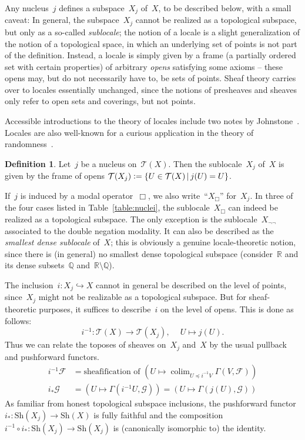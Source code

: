 \documentclass[10pt,reqno,a4paper]{amsbook}
\theoremstyle{definition}
\newtheorem{defn}{Definition}[section]
\theoremstyle{plain}
\theoremstyle{remark}
\newcommand{\F}{\mathcal{F}}
\renewcommand{\G}{\mathcal{G}}
\newcommand{\T}{\mathcal{T}}
\newcommand{\RR}{\mathbb{R}}
\newcommand{\QQ}{\mathbb{Q}}
\newcommand{\Sh}{\mathrm{Sh}}
\DeclareMathOperator{\colim}{colim}
\newcommand{\Open}{\T}
\newcommand{\?}{\,{:}\,}
\renewcommand{\_}{\mathpunct{.}\,}
\newcommand{\lra}{\longrightarrow}
\newcommand{\defeq}{\vcentcolon=}
\begin{document}
Any nucleus~$j$ defines a subspace~$X_j$ of~$X$, to be described below, with a small caveat: In
general, the subspace~$X_j$ cannot be realized as a topological subspace, but
only as a so-called \emph{sublocale}; the notion of a locale is a slight
generalization of the notion of a topological space, in which an underlying set
of points is not part of the definition. Instead, a locale is simply given by a
frame (a partially ordered set with certain properties) of arbitrary \emph{opens} satisfying some axioms -- these opens may, but do not necessarily have to,
be sets of points. Sheaf theory carries over to locales essentially unchanged,
since the notions of presheaves and sheaves only refer to open sets and coverings,
but not points.

Accessible introductions to the theory of locales include two notes by
Johnstone~\cite{johnstone:art,johnstone:point}. Locales are also well-known for
a curious application in the theory of
randomness~\cite{simpson:random1,simpson:random2}.

\begin{defn}\label{defn:subspace-by-nucleus}Let~$j$ be a nucleus on~$\Open(X)$.
Then the sublocale~$X_j$ of~$X$ is given by the frame of opens
$\Open(X_j) \defeq \{ U \in \Open(X) \,|\, j(U) = U \}$.
\end{defn}
If~$j$ is induced by a modal operator~$\Box$, we also write~``$X_\Box$''
for~$X_j$. In three of the four cases listed in Table~\ref{table:nuclei}, the
sublocale~$X_\Box$ can indeed be realized as a topological subspace. The only
exception is the sublocale~$X_{\neg\neg}$ associated to the double negation
modality. It can also be described as the \emph{smallest dense sublocale}
of~$X$; this is obviously a genuine locale-theoretic notion, since there
is (in general) no smallest dense topological subspace
(consider~$\RR$ and its dense subsets~$\QQ$ and~$\RR \setminus \QQ$).

The inclusion~$i : X_j \hookrightarrow X$ cannot in general be described on the
level of points, since~$X_j$ might not be realizable as a topological subspace.
But for sheaf-theoretic purposes, it suffices to describe~$i$ on the level of
opens. This is done as follows:
\[ i^{-1} : \Open(X) \lra \Open(X_j),\ \quad U \longmapsto j(U). \]
Thus we can relate the toposes of sheaves on~$X_j$ and~$X$ by the usual
pullback and pushforward functors.
\begin{align*}
  i^{-1} \F &= \text{sheafification of $(U \mapsto \colim_{U \preceq i^{-1}V} \Gamma(V,\F))$} \\
  i_* \G &= (U \mapsto \Gamma(i^{-1}U, \G)) = (U \mapsto \Gamma(j(U), \G))
\end{align*}
As familiar from honest topological subspace inclusions, the pushforward
functor~$i_* : \Sh(X_j) \to \Sh(X)$ is fully faithful and the composition~$i^{-1}
\circ i_* : \Sh(X_j) \to \Sh(X_j)$ is (canonically isomorphic to) the identity.
\end{document}
